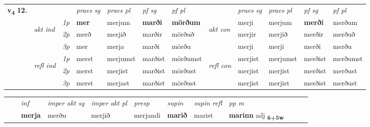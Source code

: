 \begin{tabular}{llllllllllll} \toprule
\multirow{4}{*}{{{\textbf{v{\textsubscript{4}}} \Large{\textbf{12.}}}}}  & &   &  \textit{praes sg}  & \textit{praes pl}  &\textit{ pf sg} & \textit{pf pl} &  &  \textit{praes sg}  & \textit{praes pl}  & \textit{pf sg} & \textit{pf pl } \\*
	\cmidrule{4-7} \cmidrule{9-12}
 & \multirow{3}{*}{\begin{turn}{90}\textit{akt ind}\end{turn}} & {\textit{1p}} & \textbf{mer} & merjum    & \textbf{marði} & \textbf{mörðum} & \multirow{3}{*}{\begin{turn}{90}\textit{akt con}\end{turn}} &merji & merjum & \textbf{merði} & merðum\\*
& &  {\textit{2p}} &  merð  & merjið   & marðir & mörðuð & & merjir & merjið & merðir & merðuð \\*
& &  {\textit{3p}} & mer & merja   & marði & mörðu & & merji & merji& merði & merðu  \\*
\cmidrule{4-7} \cmidrule{9-12}
 &\multirow{3}{*}{\begin{turn}{90}\textit{refl ind}\end{turn}} & {\textit{1p}} & merst & merjumst    & marðist & mörðumst & \multirow{3}{*}{\begin{turn}{90}\textit{refl con}\end{turn}}  &merjist & merjumst & merðist & merðumst\\*
 &&  {\textit{2p}} &  merst  & merjist   & marðist & mörðust & &merjist & merjist & merðist & merðust \\*
& &  {\textit{3p}} & merst & merjast   & marðist & mörðust & & merjist & merjist& merðist & merðust  \\*
\cmidrule{4-7} \cmidrule{9-12}
\end{tabular}


\begin{tabular}{llllllllllll}
 & & \textit{inf} & \textit{imper akt sg} & \textit{imper akt pl}   & \textit{presp} & \textit{supin} & \textit{supin refl} & \textit{pp m}     \\*
  & & \textbf{merja} & merðu  & merjið   & merjandi &  \textbf{marið} & marist & \textbf{marinn} adj \textbf{\textsubscript{6+5w}} \\*
\cmidrule{1-12}
\end{tabular}



